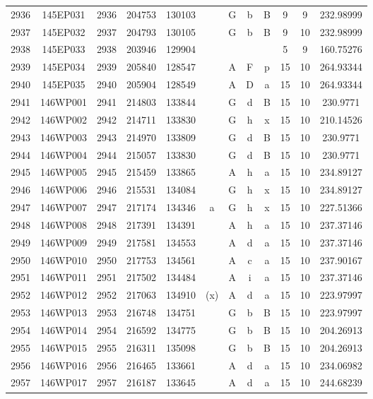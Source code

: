 \begin{tabular}{|*{12}{c|}}
2936 & 145EP031 & 2936 & 204753 & 130103 &  & G & b & B & 9 & 9 & 232.98999 \\ 
2937 & 145EP032 & 2937 & 204793 & 130105 &  & G & b & B & 9 & 10 & 232.98999 \\ 
2938 & 145EP033 & 2938 & 203946 & 129904 &  &  &  &  & 5 & 9 & 160.75276 \\ 
2939 & 145EP034 & 2939 & 205840 & 128547 &  & A & F & p & 15 & 10 & 264.93344 \\ 
2940 & 145EP035 & 2940 & 205904 & 128549 &  & A & D & a & 15 & 10 & 264.93344 \\ 
2941 & 146WP001 & 2941 & 214803 & 133844 &  & G & d & B & 15 & 10 & 230.9771 \\ 
2942 & 146WP002 & 2942 & 214711 & 133830 &  & G & h & x & 15 & 10 & 210.14526 \\ 
2943 & 146WP003 & 2943 & 214970 & 133809 &  & G & d & B & 15 & 10 & 230.9771 \\ 
2944 & 146WP004 & 2944 & 215057 & 133830 &  & G & d & B & 15 & 10 & 230.9771 \\ 
2945 & 146WP005 & 2945 & 215459 & 133865 &  & A & h & a & 15 & 10 & 234.89127 \\ 
2946 & 146WP006 & 2946 & 215531 & 134084 &  & G & h & x & 15 & 10 & 234.89127 \\ 
2947 & 146WP007 & 2947 & 217174 & 134346 & a & G & h & x & 15 & 10 & 227.51366 \\ 
2948 & 146WP008 & 2948 & 217391 & 134391 &  & A & h & a & 15 & 10 & 237.37146 \\ 
2949 & 146WP009 & 2949 & 217581 & 134553 &  & A & d & a & 15 & 10 & 237.37146 \\ 
2950 & 146WP010 & 2950 & 217753 & 134561 &  & A & c & a & 15 & 10 & 237.90167 \\ 
2951 & 146WP011 & 2951 & 217502 & 134484 &  & A & i & a & 15 & 10 & 237.37146 \\ 
2952 & 146WP012 & 2952 & 217063 & 134910 & (x) & A & d & a & 15 & 10 & 223.97997 \\ 
2953 & 146WP013 & 2953 & 216748 & 134751 &  & G & b & B & 15 & 10 & 223.97997 \\ 
2954 & 146WP014 & 2954 & 216592 & 134775 &  & G & b & B & 15 & 10 & 204.26913 \\ 
2955 & 146WP015 & 2955 & 216311 & 135098 &  & G & b & B & 15 & 10 & 204.26913 \\ 
2956 & 146WP016 & 2956 & 216465 & 133661 &  & A & d & a & 15 & 10 & 234.06982 \\ 
2957 & 146WP017 & 2957 & 216187 & 133645 &  & A & d & a & 15 & 10 & 244.68239 \\ 

\end{tabular}
